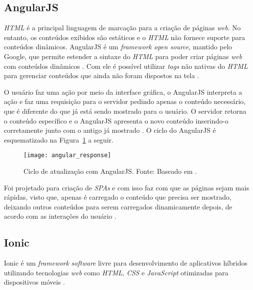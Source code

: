 \subsection{AngularJS} \label{subsection:angularjs}

\textit{HTML} é a principal linguagem de marcação para a criação de páginas \textit{web}. No entanto, os conteúdos 
exibidos são estáticos e o \textit{HTML} não fornece suporte para conteúdos dinâmicos.
AngularJS é um \textit{framework open source}, mantido pelo Google, que permite estender a sintaxe do 
\textit{HTML} para poder criar páginas \textit{web} com conteúdos dinâmicos \cite{bezerra_desenvolvimento_2016}. Com ele é possível utilizar \textit{tags} 
não nativas do \textit{HTML} para gerenciar conteúdos que ainda não 
foram dispostos na tela \cite{google_angularjs_2016}.

O usuário faz uma ação por meio da interface gráfica, 
o AngularJS interpreta a ação e faz uma requisição para o servidor pedindo apenas o conteúdo necessário, que é 
diferente do que já está sendo mostrado para o usuário. 
O servidor retorna o conteúdo específico e o AngularJS apresenta o novo conteúdo inserindo-o corretamente junto 
com o antigo já mostrado \cite{ursino_angularjs:_2015}. O ciclo do AngularJS é esquematizado na Figura~\ref{fig:angular_response} a seguir.

\begin{figure}[h]
  \centering
    \texttt{[image: angular\_response]}
    \caption[Ciclo de atualização com AngularJS]{ Ciclo de atualização com AngularJS. Fonte: Baseado em \cite{ursino_angularjs:_2015}.}
	\label{fig:angular_response}
\end{figure}

Foi projetado para criação de \textit{SPAs} e com isso faz com que as páginas sejam mais rápidas, visto que, apenas é carregado o conteúdo que precisa ser mostrado, 
deixando outros conteúdos para serem carregados dinamicamente depois, de acordo com as interações do usuário \cite{rodriguez_diseno_2015}.

\subsection{Ionic} \label{subsection:ionic}
Ionic é um \textit{framework} \textit{software} livre para desenvolvimento de aplicativos híbridos utilizando tecnologias 
\textit{web} como \textit{HTML}, \textit{CSS} e \textit{JavaScript} otimizadas para dispositivos móveis \cite{drifty_ionic:_2016}. 

